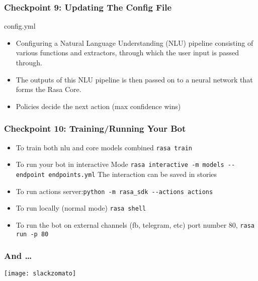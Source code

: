 \begin{frame}\frametitle{Checkpoint 9: Updating The Config File}
config.yml
 \begin{itemize}
\item Configuring a Natural Language Understanding (NLU) pipeline consisting of various functions and extractors, through which the user input is passed through.
\item The outputs of this NLU pipeline is then passed on to a neural network that forms the Rasa Core.
\item Policies decide the next action (max confidence wins)
\end{itemize}

\end{frame}

\begin{frame}\frametitle{Checkpoint 10: Training/Running Your Bot}
 \begin{itemize}
\item To train both nlu and core models combined \lstinline|rasa train|
\item To run your bot in interactive Mode \lstinline|rasa interactive -m models --endpoint endpoints.yml| The interaction can be saved in stories
\item To run actions server:\lstinline|python -m rasa_sdk --actions actions|
\item To run locally (normal mode) \lstinline|rasa shell|
\item To run the bot on external channels (fb, telegram, etc) port number 80, \lstinline|rasa run -p 80|
\end{itemize}

\end{frame}

 \begin{frame}[fragile]\frametitle{And \ldots}

\begin{center}
\texttt{[image: slackzomato]}
\end{center}


\end{frame}
